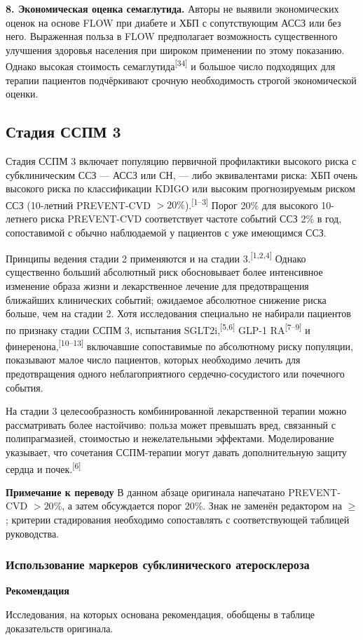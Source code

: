 \documentclass[11pt,a4paper]{article}
\newcommand{\src}[1]{\textsuperscript{[#1]}}
\newcommand{\editorial}[1]{\par\begingroup\small\color{black!70}\textbf{Примечание к переводу} #1\par\endgroup}
\newcommand{\heading}[1]{\par\medskip\textbf{#1}\par}
\begin{document}
\textbf{8. Экономическая оценка семаглутида.} Авторы не выявили экономических оценок на основе FLOW при диабете и ХБП с сопутствующим АССЗ или без него. Выраженная польза в FLOW предполагает возможность существенного улучшения здоровья населения при широком применении по этому показанию. Однако высокая стоимость семаглутида\src{34} и большое число подходящих для терапии пациентов подчёркивают срочную необходимость строгой экономической оценки.

\subsection{Стадия ССПМ 3}
Стадия ССПМ 3 включает популяцию первичной профилактики высокого риска с субклиническим ССЗ --- АССЗ или СН, --- либо эквивалентами риска: ХБП очень высокого риска по классификации KDIGO или высоким прогнозируемым риском ССЗ (10-летний PREVENT-CVD $>20\%$).\src{1--3} Порог 20\% для высокого 10-летнего риска PREVENT-CVD соответствует частоте событий ССЗ 2\% в год, сопоставимой с обычно наблюдаемой у пациентов с уже имеющимся ССЗ.

Принципы ведения стадии 2 применяются и на стадии 3.\src{1,2,4} Однако существенно больший абсолютный риск обосновывает более интенсивное изменение образа жизни и лекарственное лечение для предотвращения ближайших клинических событий; ожидаемое абсолютное снижение риска больше, чем на стадии 2. Хотя исследования специально не набирали пациентов по признаку стадии ССПМ 3, испытания SGLT2i,\src{5,6} GLP-1 RA\src{7--9} и финеренона,\src{10--13} включавшие сопоставимые по абсолютному риску популяции, показывают малое число пациентов, которых необходимо лечить для предотвращения одного неблагоприятного сердечно-сосудистого или почечного события.

На стадии 3 целесообразность комбинированной лекарственной терапии можно рассматривать более настойчиво: польза может превышать вред, связанный с полипрагмазией, стоимостью и нежелательными эффектами. Моделирование указывает, что сочетания ССПМ-терапии могут давать дополнительную защиту сердца и почек.\src{6}
\editorial{В данном абзаце оригинала напечатано PREVENT-CVD $>20\%$, а затем обсуждается порог 20\%. Знак не заменён редактором на $\geq$; критерии стадирования необходимо сопоставлять с соответствующей таблицей руководства.}

\subsubsection{Использование маркеров субклинического атеросклероза}
\heading{Рекомендация}
Исследования, на которых основана рекомендация, обобщены в таблице доказательств оригинала.
\end{document}
